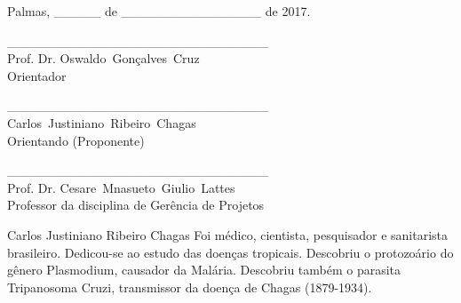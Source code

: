 \documentclass[journal]{IEEEtran}									%
\begin{document}
\vspace{1cm}		%

\begin{flushright}
Palmas, \_\_\_\_\_ de \_\_\_\_\_\_\_\_\_\_\_\_\_\_\_ de 2017.
\end{flushright}

\vspace{2cm}

\begin{center}
\_\_\_\_\_\_\_\_\_\_\_\_\_\_\_\_\_\_\_\_\_\_\_\_\_\_\_\_ \\
Prof. Dr. Oswaldo~Gonçalves~Cruz\\
Orientador\\
\end{center}

\vspace{1.5cm}

\begin{center}
\_\_\_\_\_\_\_\_\_\_\_\_\_\_\_\_\_\_\_\_\_\_\_\_\_\_\_\_ \\
Carlos~Justiniano~Ribeiro~Chagas\\
Orientando (Proponente)\\
\end{center}

\vspace{1.5cm}

\begin{center}
\_\_\_\_\_\_\_\_\_\_\_\_\_\_\_\_\_\_\_\_\_\_\_\_\_\_\_\_ \\
Prof. Dr. Cesare~Mnasueto~Giulio~Lattes\\
Professor da disciplina de Gerência de Projetos
\end{center}

\newpage %


\newpage %


\begin{IEEEbiography}
{Carlos Justiniano Ribeiro Chagas}
Foi médico, cientista, pesquisador e sanitarista brasileiro. Dedicou-se ao estudo das doenças tropicais. Descobriu o protozoário do gênero Plasmodium, causador da Malária. Descobriu também o parasita Tripanosoma Cruzi, transmissor da doença de Chagas (1879-1934).
\end{IEEEbiography}
\end{document}
